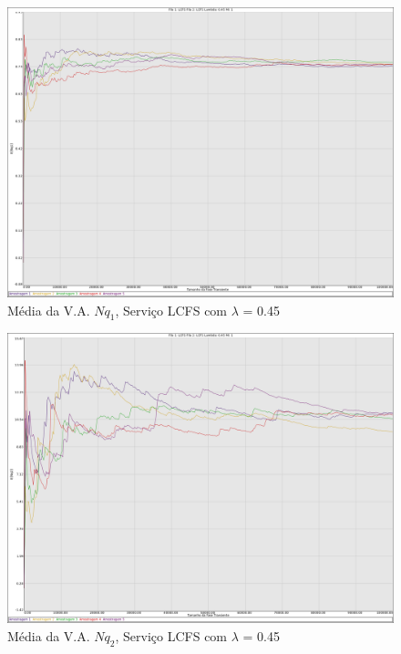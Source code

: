 \documentclass[a4paper,10pt]{article}
\begin{document}
\begin{figure}
	\caption{Média da V.A. $Nq_1$, Serviço LCFS com $\lambda$ = 0.45}
	\label{figTransienteLCFSfila1Nq}
	\includegraphics[scale = 0.20]{./graficos_transiente_1/LCFS/03.png}
\end{figure}

\begin{figure}
	\caption{Média da V.A. $Nq_2$, Serviço LCFS com $\lambda$ = 0.45}
	\label{figTransienteLCFSfila2Nq}
	\includegraphics[scale = 0.20]{./graficos_transiente_1/LCFS/04.png}
\end{figure}
\end{document}
